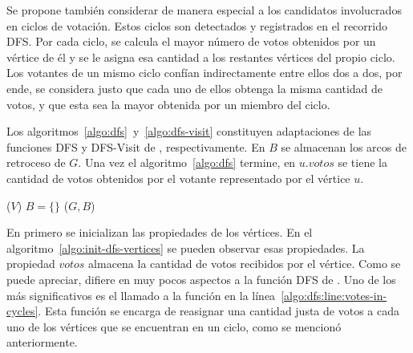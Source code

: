 Se propone tambi\'en considerar de manera especial a los candidatos involucrados en ciclos de votaci\'on. Estos ciclos son detectados y registrados en el recorrido DFS. Por cada ciclo, se calcula el mayor n\'umero de votos obtenidos por un v\'ertice de \'el y se le asigna esa cantidad a los restantes v\'ertices del propio ciclo. Los votantes de un mismo ciclo conf\'ian indirectamente entre ellos dos a dos, por ende, se considera justo que cada uno de ellos obtenga la misma cantidad de votos, y que esta sea la mayor obtenida por un miembro del ciclo.


Los algoritmos~\ref{algo:dfs}~y~\ref{algo:dfs-visit}  constituyen adaptaciones   de las funciones DFS y DFS-Visit de \cite{intro-to-algo-3}, respectivamente. En $B$ se almacenan los arcos de retroceso de $G$.    Una vez el algoritmo~\ref{algo:dfs} termine, en $u.votos$ se tiene la cantidad de votos obtenidos por el votante representado por el v\'ertice $u$. 

\begin{algorithm}[!h]
    \caption{\dfscaption}
    \label{algo:dfs}
    \DontPrintSemicolon
    \SetAlgoLined
    \BlankLine

    \initdfsvertices($V$)\;
    $B = \{\}$\;
    \cyclevotescaption($G, B$)\; \label{algo:dfs:line:votes-in-cycles}
\end{algorithm}

En \dfscaption \;primero se inicializan las propiedades de los v\'ertices. En el algoritmo~\ref{algo:init-dfs-vertices} se pueden observar esas propiedades. La propiedad $votos$ almacena la cantidad de votos recibidos por el v\'ertice. Como se puede apreciar,  \dfscaption \;difiere en muy pocos aspectos a la funci\'on DFS de \cite{intro-to-algo-3}. Uno de los m\'as significativos es el llamado a la funci\'on \cyclevotescaption \;en la l\'inea~\ref{algo:dfs:line:votes-in-cycles}. Esta funci\'on se encarga de reasignar una cantidad justa de votos a cada uno de los v\'ertices que se encuentran en un ciclo, como se mencion\'o anteriormente.  

\begin{algorithm}[!h]
    \caption{\initdfsvertices}
    \label{algo:init-dfs-vertices}
    \DontPrintSemicolon
    \SetAlgoLined
    \BlankLine

\end{algorithm}

